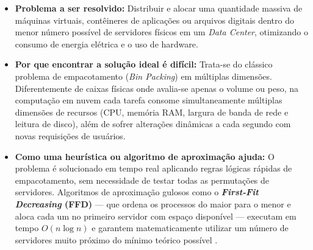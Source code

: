 \begin{itemize}
    \item \textbf{Problema a ser resolvido:} Distribuir e alocar uma quantidade massiva de máquinas virtuais, contêineres de aplicações ou arquivos digitais dentro do menor número possível de servidores físicos em um \textit{Data Center}, otimizando o consumo de energia elétrica e o uso de hardware.
    \item \textbf{Por que encontrar a solução ideal é difícil:} Trata-se do clássico problema de empacotamento (\textit{Bin Packing}) em múltiplas dimensões. Diferentemente de caixas físicas onde avalia-se apenas o volume ou peso, na computação em nuvem cada tarefa consome simultaneamente múltiplas dimensões de recursos (CPU, memória RAM, largura de banda de rede e leitura de disco), além de sofrer alterações dinâmicas a cada segundo com novas requisições de usuários.
    \item \textbf{Como uma heurística ou algoritmo de aproximação ajuda:} O problema é solucionado em tempo real aplicando regras lógicas rápidas de empacotamento, sem necessidade de testar todas as permutações de servidores. Algoritmos de aproximação gulosos como o \textbf{\textit{First-Fit Decreasing} (FFD)} --- que ordena os processos do maior para o menor e aloca cada um no primeiro servidor com espaço disponível --- executam em tempo $O(n \log n)$ e garantem matematicamente utilizar um número de servidores muito próximo do mínimo teórico possível \cite{goldbarg2005, parpinelli_udesc}.
\end{itemize}
